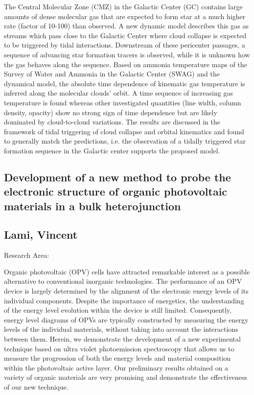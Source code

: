 \noindent The Central Molecular Zone (CMZ) in the Galactic Center (GC) contains large amounts of dense molecular gas that are expected to form star at a much higher rate (factor of 10-100) than observed. A new dynamic model describes this gas as streams which pass close to the Galactic Center where cloud collapse is expected to be triggered by tidal interactions. Downstream of these pericenter passages, a sequence of advancing star formation tracers is observed, while it is unknown how the gas behaves along the sequence.\newline
Based on ammonia temperature maps of the Survey of Water and Ammonia in the Galactic Center (SWAG) and the dynamical model, the absolute time dependence of kinematic gas temperature is inferred along the molecular clouds’ orbit. A time sequence of increasing gas temperature is found whereas other investigated quantities (line width, column density, opacity) show no strong sign of time dependence but are likely dominated by cloud-to-cloud variations. The results are discussed in the framework of tidal triggering of cloud collapse and orbital kinematics and found to generally match the predictions, i.e. the observation of a tidally triggered star formation sequence in the Galactic center supports the proposed model.
\newpage
\subsection*{\centering \large Development of a new method to probe the electronic structure of organic photovoltaic materials in a bulk heterojunction}
\subsection*{\centering \normalsize Lami, Vincent}
Research Area: \newline

\noindent Organic photovoltaic (OPV) cells have attracted remarkable interest as a possible alternative to conventional inorganic technologies. The performance of an OPV device is largely determined by the alignment of the electronic energy levels of its individual components. Despite the importance of energetics, the understanding of the energy level evolution within the device is still limited. Consequently, energy level diagrams of OPVs are typically constructed by measuring the energy levels of the individual materials, without taking into account the interactions between them. Herein, we demonstrate the development of a new experimental technique based on ultra violet photoemission spectroscopy that allows us to measure the progression of both the energy levels and material composition within the photovoltaic active layer. Our preliminary results obtained on a variety of organic materials are very promising and demonstrate the effectiveness of our new technique.

